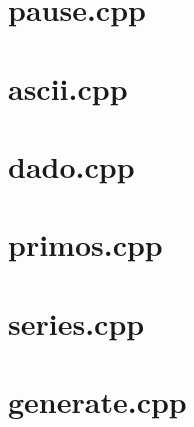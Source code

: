 \documentclass{book}
\begin{document}

\section{pause.cpp}




\section{ascii.cpp}




\section{dado.cpp}




\section{primos.cpp}




\section{series.cpp}







\section{generate.cpp}


\end{document}
